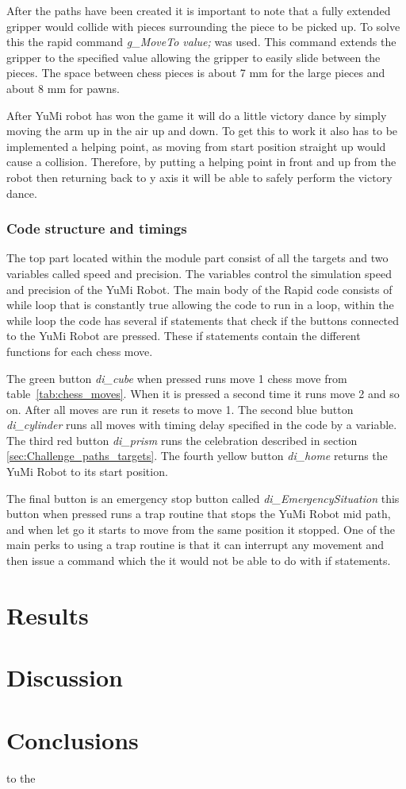 \documentclass[a4paper,12pt]{article}
\begin{document}
After the paths have been created it is important to note that a fully extended gripper would collide with pieces surrounding the piece to be picked up. To solve this the rapid command \textit{g\_MoveTo value;} was used. This command extends the gripper to the specified value allowing the gripper to easily slide between the pieces. The space between chess pieces is about 7 mm for the large pieces and about 8 mm for pawns.

After YuMi robot has won the game it will do a little victory dance by simply moving the arm up in the air up and down. To get this to work it also has to be implemented a helping point, as moving from start position straight up would cause a collision. Therefore, by putting a helping point in front and up from the robot then returning back to y axis it will be able to safely perform the victory dance. 

\subsubsection{Code structure and timings}
The top part located within the module part consist of all the targets and two variables called speed and precision. The variables control the simulation speed and precision of the YuMi Robot. The main body of the Rapid code consists of while loop that is constantly true allowing the code to run in a loop, within the while loop the code has several if statements that check if the buttons connected to the YuMi Robot are pressed. These if statements contain the different functions for each chess move.

The green button \textit{di\_cube} when pressed runs move 1 chess move from table~\ref{tab:chess_moves}. When it is pressed a second time it runs move 2 and so on. After all moves are run it resets to move 1. The second blue button \textit{di\_cylinder} runs all moves with timing delay specified in the code by a variable. The third red button \textit{di\_prism} runs the celebration described in section \ref{sec:Challenge_paths_targets}. The fourth yellow button \textit{di\_home} returns the YuMi Robot to its start position.

The final button is an emergency stop button called \textit{di\_EmergencySituation} this button when pressed runs a trap routine that stops the YuMi Robot mid path, and when let go it starts to move from the same position it stopped. One of the main perks to using a trap routine is that it can interrupt any movement and then issue a command which the it would not be able to do with if statements.

\section{Results}
\section{Discussion}
\section{Conclusions} to the
\end{document}

